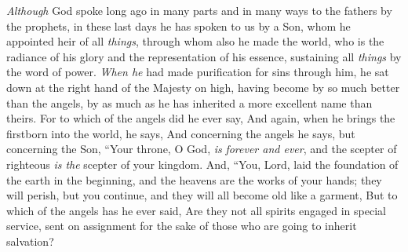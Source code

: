 
\begin{biblechapter} %
 \textit{Although} God spoke long ago in many parts and in many ways to the fathers by the prophets,
\verse in these last days he has spoken to us by a Son, whom he appointed heir of all \textit{things}, through whom also he made the world,
\verse who is the radiance of his glory and the representation of his essence, sustaining all \textit{things} by the word of power. \textit{When he} had made purification for sins through him, he sat down at the right hand of the Majesty on high,
\verse having become by so much better than the angels, by as much as he has inherited a more excellent name than theirs.
 For to which of the angels did he ever say,
\verse And again, when he brings the firstborn into the world, he says,
\verse And concerning the angels he says,
\verse but concerning the Son,
\verse “Your throne, O God, \textit{is} \textit{forever and ever}, 
and the scepter of righteous \textit{is the} scepter of your kingdom.
\verse And,
\verse “You, Lord, laid the foundation of the earth in the beginning, 
and the heavens are the works of your hands;
\verse they will perish, but you continue, 
and they will all become old like a garment,
\verse But to which of the angels has he ever said,
\verse Are they not all spirits engaged in special service, sent on assignment for the sake of those who are going to inherit salvation?
\end{biblechapter}

